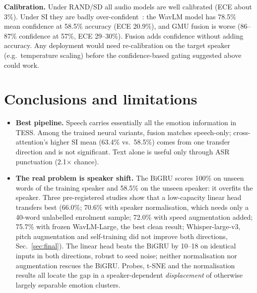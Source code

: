 \textbf{Calibration.} Under RAND/SD all audio models are well calibrated (ECE about 3\%).
Under SI they are badly over-confident~\cite{guo}: the WavLM model has 78.5\% mean confidence at 58.5\% accuracy (ECE 20.9\%), and GMU fusion is worse (86--87\% confidence at 57\%, ECE 29--30\%).
Fusion adds confidence without adding accuracy.
Any deployment would need re-calibration on the target speaker (e.g.\ temperature scaling) before the confidence-based gating suggested above could work.

\section{Conclusions and limitations}\label{sec:concl}
\begin{itemize}\setlength\itemsep{1pt}
\item \textbf{Best pipeline.} Speech carries essentially all the emotion information in TESS. Among the trained neural variants, fusion matches speech-only; cross-attention's higher SI mean (63.4\% vs.\ 58.5\%) comes from one transfer direction and is not significant. Text alone is useful only through ASR punctuation (2.1$\times$ chance).
\item \textbf{The real problem is speaker shift.} The BiGRU scores 100\% on unseen words of the training speaker and 58.5\% on the unseen speaker: it overfits the speaker. Three pre-registered studies show that a low-capacity linear head transfers best (66.0\%; 70.6\% with speaker normalisation, which needs only a 40-word unlabelled enrolment sample; 72.0\% with speed augmentation added; 75.7\% with frozen WavLM-Large, the best clean result; Whisper-large-v3, pitch augmentation and self-training did not improve both directions, Sec.~\ref{sec:final}). The linear head beats the BiGRU by 10--18\pp{} on identical inputs in both directions, robust to seed noise; neither normalisation nor augmentation rescues the BiGRU. Probes, t-SNE and the normalisation results all locate the gap in a speaker-dependent \emph{displacement} of otherwise largely separable emotion clusters.

\end{itemize}
